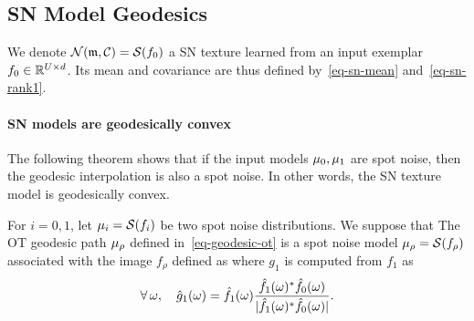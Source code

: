 \subsection{SN Model Geodesics}
\label{subsec-geodesic-sn}

We denote $\mathcal{N}({\frak m},\mathcal{C}) = \mathcal{S}(f_0)$ a SN texture learned from an input exemplar $f_0 \in \mathbb{R}^{U \times d}$. Its mean and covariance are thus defined by~\eqref{eq-sn-mean} and~\eqref{eq-sn-rank1}.

\paragraph{SN models are geodesically convex}

The following theorem shows that if the input models $\mu_0, \mu_1$ are spot noise, then the geodesic interpolation is also a spot noise. In other words, the SN texture model is geodesically convex.

\begin{theorem}\label{thm-geodesic-spot-noise}
	For $i=0,1$, let $\mu_i = \mathcal{S}(f_i)$ be two spot noise distributions. We suppose that
	The OT geodesic path $\mu_\rho$ defined in~\eqref{eq-geodesic-ot} is a spot noise model $\mu_\rho = \mathcal{S}(f_\rho)$ associated with the image $f_\rho$ defined as
	where $g_1$ is computed from $f_1$ as
	\begin{equation}
    \label{eq-SN-textons-g}
		\foralls \om, \quad
		\hat g_1(\om) = \hat f_1(\om) \frac{ \hat f_1(\om)^* \hat f_0(\om) }{ |\hat f_1(\om)^* \hat f_0(\om)| }.
	\end{equation}
\end{theorem}

